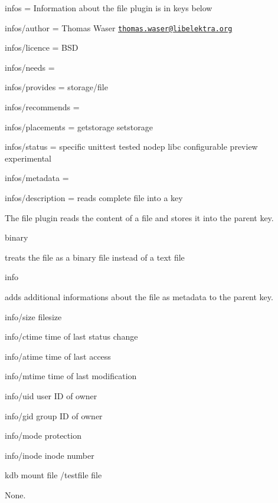 
\begin{DoxyItemize}
\item infos = Information about the file plugin is in keys below
\item infos/author = Thomas Waser \href{mailto:thomas.waser@libelektra.org}{\tt thomas.\+waser@libelektra.\+org}
\item infos/licence = B\+SD
\item infos/needs =
\item infos/provides = storage/file
\item infos/recommends =
\item infos/placements = getstorage setstorage
\item infos/status = specific unittest tested nodep libc configurable preview experimental
\item infos/metadata =
\item infos/description = reads complete file into a key
\end{DoxyItemize}

The file plugin reads the content of a file and stores it into the parent key.


\begin{DoxyItemize}
\item {\ttfamily binary}

treats the file as a binary file instead of a text file
\item {\ttfamily info}

adds additional informations about the file as metadata to the parent key.
\begin{DoxyItemize}
\item {\ttfamily info/size} filesize
\item {\ttfamily info/ctime} time of last status change
\item {\ttfamily info/atime} time of last access
\item {\ttfamily info/mtime} time of last modification
\item {\ttfamily info/uid} user ID of owner
\item {\ttfamily info/gid} group ID of owner
\item {\ttfamily info/mode} protection
\item {\ttfamily info/inode} inode number
\end{DoxyItemize}
\end{DoxyItemize}

{\ttfamily kdb mount file /testfile file}

None.

